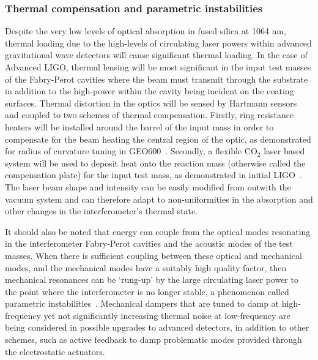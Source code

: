 \documentclass{article}
\begin{document}
\subsubsection{Thermal compensation and parametric instabilities}
\label{subsubsection:thermalcomp}

Despite the very low levels of optical absorption in fused silica at 1064 nm,
thermal loading due to the high-levels of circulating laser powers within
advanced gravitational wave detectors will cause significant thermal loading. In
the case of Advanced LIGO, thermal lensing will be most significant in the input
test masses of the Fabry-Perot cavities where the beam must transmit through the
substrate in addition to the high-power within the cavity being incident on the
coating surfaces. Thermal distortion in the optics will be sensed by Hartmann
sensors and coupled to two schemes of thermal compensation. Firstly, ring
resistance heaters will be installed around the barrel of the input mass in
order to compensate for the beam heating the central region of the optic, as
demonstrated for radius of curvature tuning in GEO600~\cite{Luck:2004}.
Secondly, a flexible CO$_2$ laser based system will be used to deposit heat onto
the reaction mass (otherwise called the compensation plate) for the input test
mass, as demonstrated in initial LIGO~\cite{Lawrence:2002,Waldman:2006}. The
laser beam shape and intensity can be easily modified from outwith the vacuum
system and can therefore adapt to non-uniformities in the absorption and other
changes in the interferometer's thermal state.

It should also be noted that energy can couple from the optical modes resonating
in the interferometer Fabry-Perot cavities and the acoustic modes of the test
masses. When there is sufficient coupling between these optical and mechanical
modes, and the mechanical modes have a suitably high quality factor, then
mechanical resonances can be `rung-up' by the large circulating laser power to
the point where the interferometer is no longer stable, a phenomenon called
parametric instabilities~\cite{Braginsky:2001}. Mechanical dampers that are
tuned to damp at high-frequency yet not significantly increasing thermal noise
at low-frequency are being considered in possible upgrades to advanced
detectors, in addition to other schemes, such as active feedback to damp
problematic modes provided through the electrostatic actuators.

\end{document}
